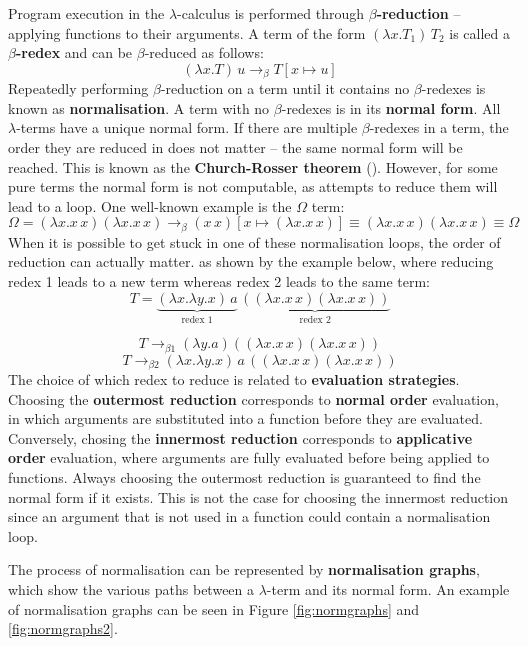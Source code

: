 \documentclass[11pt]{article}
\begin{document}
Program execution in the $\lambda$-calculus is performed through \textbf{$\beta$-reduction} -- applying functions to their arguments. A term of the form $(\lambda x. T_1) \, T_2$ is called a \textbf{$\beta$-redex} and can be $\beta$-reduced as follows:
%
$$(\lambda x. T) \, u \to_\beta T[x \mapsto u]$$
%
Repeatedly performing $\beta$-reduction on a term until it contains no $\beta$-redexes is known as \textbf{normalisation}. A term with no $\beta$-redexes is in its \textbf{normal form}. All $\lambda$-terms have a unique normal form. If there are multiple $\beta$-redexes in a term, the order they are reduced in does not matter -- the same normal form will be reached. This is known as the \textbf{Church-Rosser theorem} (\cite{churchrosser}). However, for some pure terms the normal form is not computable, as attempts to reduce them will lead to a loop. One well-known example is the $\Omega$ term:
%
$$ \Omega = (\lambda x. x \, x)(\lambda x. x \, x) \rightarrow_\beta (x \, x)[x \mapsto (\lambda x. x \, x)] \equiv (\lambda x. x \, x)(\lambda x. x \, x) \equiv \Omega $$
%
When it is possible to get stuck in one of these normalisation loops, the order of reduction can actually matter. as shown by the example below, where reducing redex 1 leads to a new term whereas redex 2 leads to the same term:
%
$$ T = \underbrace{(\lambda x. \lambda y. x) \, a}_\text{redex 1} \, \underbrace{((\lambda x. x \, x) (\lambda x. x \, x))}_\text{redex 2} $$

$$ T \rightarrow_{\beta1} (\lambda y. a)((\lambda x. x \, x)(\lambda x. x \, x)) $$
%
$$ T \rightarrow_{\beta2} (\lambda x. \lambda y. x) \, a \, ((\lambda x. x \, x)(\lambda x. x \, x))$$
%
The choice of which redex to reduce is related to \textbf{evaluation strategies}. Choosing the \textbf{outermost reduction} corresponds to \textbf{normal order} evaluation, in which arguments are substituted into a function before they are evaluated. Conversely, chosing the \textbf{innermost reduction} corresponds to \textbf{applicative order} evaluation, where arguments are fully evaluated before being applied to functions. Always choosing the outermost reduction is guaranteed to find the normal form if it exists. This is not the case for choosing the innermost reduction since an argument that is not used in a function could contain a normalisation loop.

The process of normalisation can be represented by \textbf{normalisation graphs}, which show the various paths between a $\lambda$-term and its normal form. An example of normalisation graphs can be seen in Figure \ref{fig:normgraphs} and \ref{fig:normgraphs2}.
\end{document}
